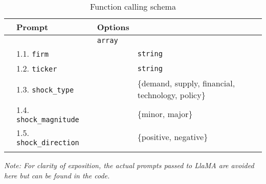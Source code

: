 
\begin{table}[H]
\centering
\begin{threeparttable}
\caption{Function calling schema}
\begin{tabular}{lL{4.1cm}L{6.8cm}L{5cm}}
\hline \Xhline{2\arrayrulewidth}
 & \textbf{Prompt} & \textbf{Options} \tabularnewline
\hline \Xhline{2\arrayrulewidth} 
 &  & \texttt{array} \tabularnewline
\hline
 & 1.1. \texttt{firm} &  & \texttt{string}
 \tabularnewline
{}   
 & 1.2. \texttt{ticker} &  & \texttt{string}
 \tabularnewline
{}   
 & 1.3. \texttt{shock\_type} &  & \{demand, supply, financial, \newline technology, policy\}\tabularnewline
{}   
 & 1.4. \texttt{shock\_magnitude} &  & \{minor, major\}\tabularnewline
{}   
 & 1.5. \texttt{shock\_direction} &  & \{positive, negative\}\tabularnewline 
\hline \Xhline{2\arrayrulewidth}
\end{tabular}
\begin{tablenotes}
\footnotesize
\mx
\item \textit{Note: 
For clarity of exposition, the actual prompts passed to LlaMA are avoided here but can be found in the code. 
}
\end{tablenotes}
\label{tab:function_calling_structure}
\end{threeparttable}
\end{table}



